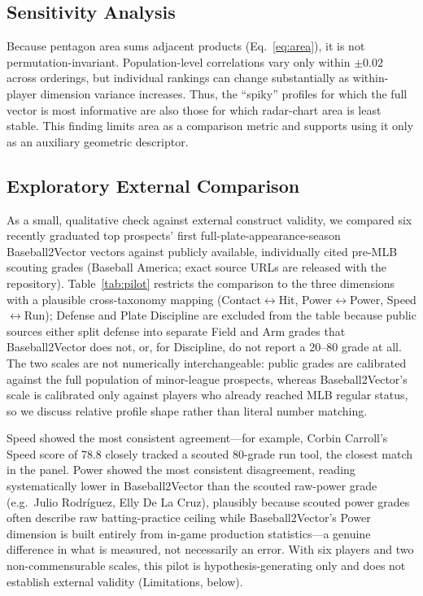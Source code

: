 \documentclass[10pt,twocolumn,letterpaper]{article}
\begin{document}
\subsection{Sensitivity Analysis}
Because pentagon area sums adjacent products (Eq.~\ref{eq:area}), it is not permutation-invariant. Population-level correlations vary only within $\pm 0.02$ across orderings, but individual rankings can change substantially as within-player dimension variance increases. Thus, the ``spiky'' profiles for which the full vector is most informative are also those for which radar-chart area is least stable. This finding limits area as a comparison metric and supports using it only as an auxiliary geometric descriptor.

\subsection{Exploratory External Comparison}
\label{sec:external-pilot}
As a small, qualitative check against external construct validity, we compared six recently graduated top prospects' first full-plate-appearance-season Baseball2Vector vectors against publicly available, individually cited pre-MLB scouting grades (Baseball America; exact source URLs are released with the repository). Table~\ref{tab:pilot} restricts the comparison to the three dimensions with a plausible cross-taxonomy mapping (Contact$\leftrightarrow$Hit, Power$\leftrightarrow$Power, Speed$\leftrightarrow$Run); Defense and Plate Discipline are excluded from the table because public sources either split defense into separate Field and Arm grades that Baseball2Vector does not, or, for Discipline, do not report a 20--80 grade at all. The two scales are not numerically interchangeable: public grades are calibrated against the full population of minor-league prospects, whereas Baseball2Vector's scale is calibrated only against players who already reached MLB regular status, so we discuss relative profile shape rather than literal number matching.

Speed showed the most consistent agreement---for example, Corbin Carroll's Speed score of 78.8 closely tracked a scouted 80-grade run tool, the closest match in the panel. Power showed the most consistent disagreement, reading systematically lower in Baseball2Vector than the scouted raw-power grade (e.g.\ Julio Rodr\'iguez, Elly De La Cruz), plausibly because scouted power grades often describe raw batting-practice ceiling while Baseball2Vector's Power dimension is built entirely from in-game production statistics---a genuine difference in what is measured, not necessarily an error. With six players and two non-commensurable scales, this pilot is hypothesis-generating only and does not establish external validity (Limitations, below).
\end{document}
